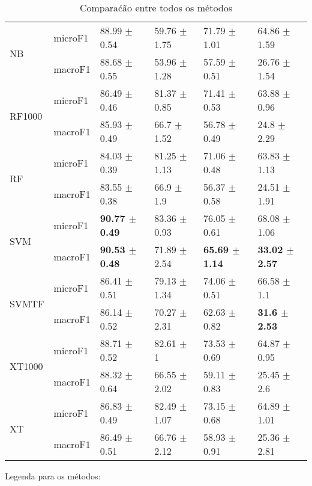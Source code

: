 \documentclass[]{article}
\begin{document}
\begin{table}[ht]
\begin{tabular}{llllll}
  \multirow{2}{*}{NB} & microF1 & 88.99 $\pm$  0.54 & 59.76 $\pm$  1.75 & 71.79 $\pm$  1.01 & 64.86 $\pm$  1.59 \\ 
   & macroF1 & 88.68 $\pm$  0.55 & 53.96 $\pm$  1.28 & 57.59 $\pm$  0.51 & 26.76 $\pm$  1.54 \\ 
  \multirow{2}{*}{RF1000} & microF1 & 86.49 $\pm$  0.46 & 81.37 $\pm$  0.85 & 71.41 $\pm$  0.53 & 63.88 $\pm$  0.96 \\ 
   & macroF1 & 85.93 $\pm$  0.49 & 66.7 $\pm$  1.52 & 56.78 $\pm$  0.49 & 24.8 $\pm$  2.29 \\ 
  \multirow{2}{*}{RF} & microF1 & 84.03 $\pm$  0.39 & 81.25 $\pm$  1.13 & 71.06 $\pm$  0.48 & 63.83 $\pm$  1.13 \\ 
   & macroF1 & 83.55 $\pm$  0.38 & 66.9 $\pm$  1.9 & 56.37 $\pm$  0.58 & 24.51 $\pm$  1.91 \\ 
  \multirow{2}{*}{SVM} & microF1 & \bf{90.77 $\pm$  0.49} & 83.36 $\pm$  0.93 & 76.05 $\pm$  0.61 & 68.08 $\pm$  1.06 \\ 
   & macroF1 & \bf{90.53 $\pm$  0.48} & 71.89 $\pm$  2.54 & \bf{65.69 $\pm$  1.14} & \bf{33.02 $\pm$  2.57} \\ 
  \multirow{2}{*}{SVMTF} & microF1 & 86.41 $\pm$  0.51 & 79.13 $\pm$  1.34 & 74.06 $\pm$  0.51 & 66.58 $\pm$  1.1 \\ 
   & macroF1 & 86.14 $\pm$  0.52 & 70.27 $\pm$  2.31 & 62.63 $\pm$  0.82 & \bf{31.6 $\pm$  2.53} \\ 
  \multirow{2}{*}{XT1000} & microF1 & 88.71 $\pm$  0.52 & 82.61 $\pm$  1 & 73.53 $\pm$  0.69 & 64.87 $\pm$  0.95 \\ 
   & macroF1 & 88.32 $\pm$  0.64 & 66.55 $\pm$  2.02 & 59.11 $\pm$  0.83 & 25.45 $\pm$  2.6 \\ 
  \multirow{2}{*}{XT} & microF1 & 86.83 $\pm$  0.49 & 82.49 $\pm$  1.07 & 73.15 $\pm$  0.68 & 64.89 $\pm$  1.01 \\ 
   & macroF1 & 86.49 $\pm$  0.51 & 66.76 $\pm$  2.12 & 58.93 $\pm$  0.91 & 25.36 $\pm$  2.81 \\ 
   \hline
\end{tabular}
\caption{Comparaćão entre todos os métodos} 
\end{table}

Legenda para os métodos:
\end{document}
